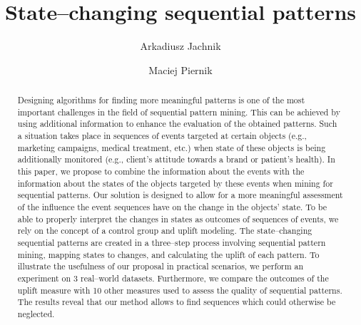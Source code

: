 \documentclass[runningheads,a4paper]{llncs}
\begin{document}
\mainmatter

\title{State--changing sequential patterns}


\author{Arkadiusz Jachnik \and Maciej Piernik}



\maketitle

\begin{abstract}
Designing algorithms for finding more meaningful patterns is one of the most important challenges in the field of sequential pattern mining.
This can be achieved by using additional information to enhance the evaluation of the obtained patterns.
Such a situation takes place in sequences of events targeted at certain objects (e.g., marketing campaigns, medical treatment, etc.) when state of these objects is being additionally monitored (e.g., client's attitude towards a brand or patient's health).
In this paper, we propose to combine the information about the events with the information about the states of the objects targeted by these events when mining for sequential patterns.
Our solution is designed to allow for a more meaningful assessment of the influence the event sequences have on the change in the objects' state.
To be able to properly interpret the changes in states as outcomes of sequences of events, we rely on the concept of a control group and uplift modeling.
The state--changing sequential patterns are created in a three--step process involving sequential pattern mining, mapping states to changes, and calculating the uplift of each pattern.
To illustrate the usefulness of our proposal in practical scenarios, we perform an experiment on 3 real--world datasets.
Furthermore, we compare the outcomes of the uplift measure with 10 other measures used to assess the quality of sequential patterns.
The results reveal that our method allows to find sequences which could otherwise be neglected.
\end{abstract}
\end{document}
